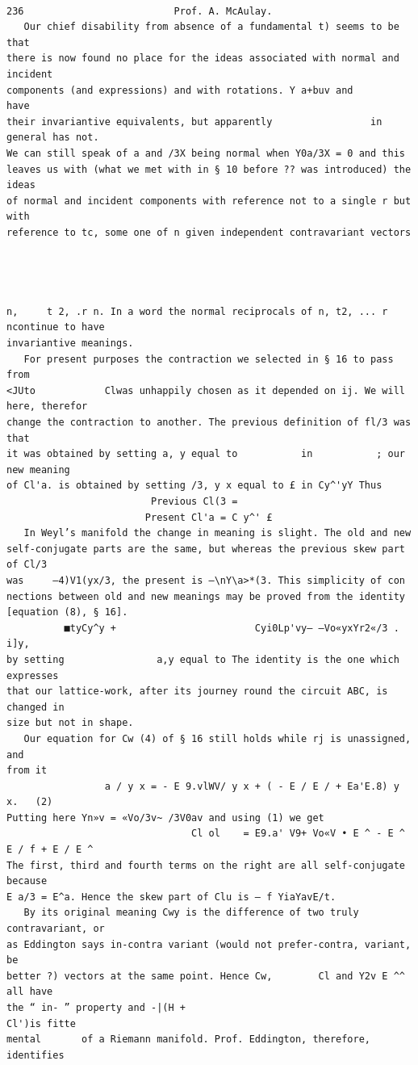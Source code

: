 \documentclass[10pt]{article}
\begin{document}
\clearpage
\begin{verbatim}

236                          Prof. A. McAulay.
   Our chief disability from absence of a fundamental t) seems to be that
there is now found no place for the ideas associated with normal and incident
components (and expressions) and with rotations. Y a+buv and                    have
their invariantive equivalents, but apparently                 in general has not.
We can still speak of a and /3X being normal when Y0a/3X = 0 and this
leaves us with (what we met with in § 10 before ?? was introduced) the ideas
of normal and incident components with reference not to a single r but with
reference to tc, some one of n given independent contravariant vectors




n,     t 2, .r n. In a word the normal reciprocals of n, t2, ... r ncontinue to have
invariantive meanings.
   For present purposes the contraction we selected in § 16 to pass from
<JUto            Clwas unhappily chosen as it depended on ij. We will here, therefor
change the contraction to another. The previous definition of fl/3 was that
it was obtained by setting a, y equal to           in           ; our new meaning
of Cl'a. is obtained by setting /3, y x equal to £ in Cy^'yY Thus
                         Previous Cl(3 =
                        Present Cl'a = C y^' £
   In Weyl’s manifold the change in meaning is slight. The old and new
self-conjugate parts are the same, but whereas the previous skew part of Cl/3
was     —4)V1(yx/3, the present is —\nY\a>*(3. This simplicity of con­
nections between old and new meanings may be proved from the identity
[equation (8), § 16].
          ■tyCy^y +                        Cyi0Lp'vy— —Vo«yxYr2«/3 . i]y,
by setting                a,y equal to The identity is the one which expresses
that our lattice-work, after its journey round the circuit ABC, is changed in
size but not in shape.
   Our equation for Cw (4) of § 16 still holds while rj is unassigned, and
from it
                 a / y x = - E 9.vlWV/ y x + ( - E / E / + Ea'E.8) y x.   (2)
Putting here Yn»v = «Vo/3v~ /3V0av and using (1) we get
                                Cl ol    = E9.a' V9+ Vo«V • E ^ - E ^ E / f + E / E ^
The first, third and fourth terms on the right are all self-conjugate because
E a/3 = E^a. Hence the skew part of Clu is — f YiaYavE/t.
   By its original meaning Cwy is the difference of two truly contravariant, or
as Eddington says in-contra variant (would not prefer-contra, variant, be
better ?) vectors at the same point. Hence Cw,        Cl and Y2v E ^^ all have
the “ in- ” property and -|(H +                                          Cl')is fitte
mental       of a Riemann manifold. Prof. Eddington, therefore, identifies


\end{verbatim}
\end{document}
